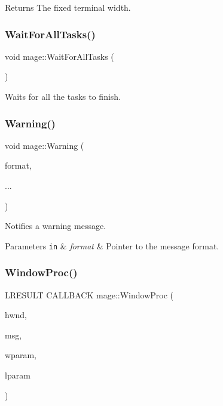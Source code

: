 \begin{DoxyReturn}{Returns}
The fixed terminal width. 
\end{DoxyReturn}
\hypertarget{namespacemage_a7da78c39175a029c92ed42d8fb9f30af}{}\label{namespacemage_a7da78c39175a029c92ed42d8fb9f30af} 
\subsubsection{\texorpdfstring{Wait\+For\+All\+Tasks()}{WaitForAllTasks()}}
{\footnotesize\ttfamily void mage\+::\+Wait\+For\+All\+Tasks (\begin{DoxyParamCaption}{ }\end{DoxyParamCaption})}

Waits for all the tasks to finish. \hypertarget{namespacemage_a0eccd8065c75d5f2bf86b48a5be3bfe5}{}\label{namespacemage_a0eccd8065c75d5f2bf86b48a5be3bfe5} 
\subsubsection{\texorpdfstring{Warning()}{Warning()}}
{\footnotesize\ttfamily void mage\+::\+Warning (\begin{DoxyParamCaption}\item[{const char $\ast$}]{format,  }\item[{}]{... }\end{DoxyParamCaption})}

Notifies a warning message.


\begin{DoxyParams}[1]{Parameters}
\mbox{\tt in}  & {\em format} & Pointer to the message format. \\
\hline
\end{DoxyParams}
\hypertarget{namespacemage_a327147b1d76dcb41c17c23f9603d80c1}{}\label{namespacemage_a327147b1d76dcb41c17c23f9603d80c1} 
\subsubsection{\texorpdfstring{Window\+Proc()}{WindowProc()}}
{\footnotesize\ttfamily L\+R\+E\+S\+U\+LT C\+A\+L\+L\+B\+A\+CK mage\+::\+Window\+Proc (\begin{DoxyParamCaption}\item[{H\+W\+ND}]{hwnd,  }\item[{U\+I\+NT}]{msg,  }\item[{W\+P\+A\+R\+AM}]{wparam,  }\item[{L\+P\+A\+R\+AM}]{lparam }\end{DoxyParamCaption})}

